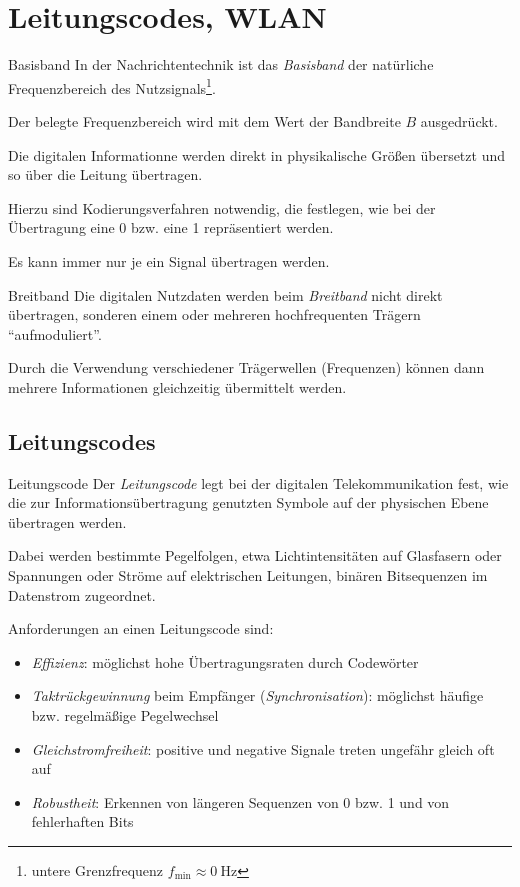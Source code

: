\section{Leitungscodes, WLAN}

\begin{defi}{Basisband}
    In der Nachrichtentechnik ist das \emph{Basisband} der natürliche Frequenzbereich des Nutzsignals\footnote{untere Grenzfrequenz $f_{\min} \approx 0 \ \text{Hz}$}.

    Der belegte Frequenzbereich wird mit dem Wert der Bandbreite $B$ ausgedrückt.

    Die digitalen Informationne werden direkt in physikalische Größen übersetzt und so über die Leitung übertragen.

    Hierzu sind Kodierungsverfahren notwendig, die festlegen, wie bei der Übertragung eine 0 bzw. eine 1 repräsentiert werden.

    Es kann immer nur je ein Signal übertragen werden.
\end{defi}

\begin{defi}{Breitband}
    Die digitalen Nutzdaten werden beim \emph{Breitband} nicht direkt übertragen, sonderen einem oder mehreren hochfrequenten Trägern \enquote{aufmoduliert}.

    Durch die Verwendung verschiedener Trägerwellen (Frequenzen) können dann mehrere Informationen gleichzeitig übermittelt werden.
\end{defi}

\subsection{Leitungscodes}

\begin{defi}{Leitungscode}
    Der \emph{Leitungscode} legt bei der digitalen Telekommunikation fest, wie die zur Informationsübertragung genutzten Symbole auf der physischen Ebene übertragen werden.

    Dabei werden bestimmte Pegelfolgen, etwa Lichtintensitäten auf Glasfasern oder Spannungen oder Ströme auf elektrischen Leitungen, binären Bitsequenzen im Datenstrom zugeordnet.

    Anforderungen an einen Leitungscode sind:
    \begin{itemize}
        \item \emph{Effizienz}: möglichst hohe Übertragungsraten durch Codewörter
        \item \emph{Taktrückgewinnung} beim Empfänger (\emph{Synchronisation}): möglichst häufige bzw. regelmäßige Pegelwechsel
        \item \emph{Gleichstromfreiheit}: positive und negative Signale treten ungefähr gleich oft auf
        \item \emph{Robustheit}: Erkennen von längeren Sequenzen von 0 bzw. 1 und von fehlerhaften Bits
    \end{itemize}
\end{defi}

